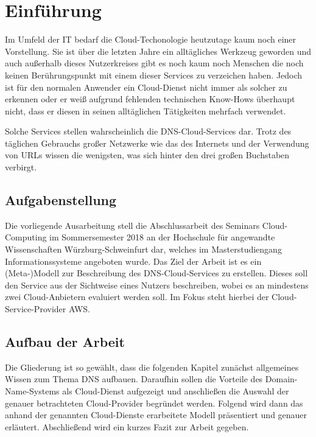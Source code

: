 \section{Einführung}
Im Umfeld der IT bedarf die Cloud-Techonologie heutzutage kaum noch einer Vorstellung. Sie ist über die letzten Jahre ein alltägliches Werkzeug geworden und auch außerhalb dieses Nutzerkreises gibt es noch kaum noch Menschen die noch keinen Berührungspunkt mit einem dieser Services zu verzeichen haben. Jedoch ist für den normalen Anwender ein Cloud-Dienst nicht immer als solcher zu erkennen oder er weiß aufgrund fehlenden technischen Know-Hows überhaupt nicht, dass er diesen in seinen alltäglichen Tätigkeiten mehrfach verwendet.

Solche Services stellen wahrscheinlich die DNS-Cloud-Services dar. Trotz des täglichen Gebrauchs großer Netzwerke wie das des Internets und der Verwendung von URLs wissen die wenigsten, was sich hinter den drei großen Buchstaben verbirgt.

\subsection{Aufgabenstellung}
Die vorliegende Ausarbeitung stell die Abschlussarbeit des Seminars Cloud-Computing im Sommersemester 2018 an der Hochschule für angewandte Wissenschaften Würzburg-Schweinfurt dar, welches im Masterstudiengang Informationssysteme angeboten wurde. Das Ziel der Arbeit ist es  ein (Meta-)Modell zur Beschreibung des DNS-Cloud-Services zu erstellen. Dieses soll den Service aus der Sichtweise eines Nutzers beschreiben, wobei es an mindestens zwei Cloud-Anbietern evaluiert werden soll. Im Fokus steht hierbei der Cloud-Service-Provider AWS.

\subsection{Aufbau der Arbeit}
Die Gliederung ist so gewählt, dass die folgenden Kapitel zunächst allgemeines Wissen zum Thema DNS aufbauen. Daraufhin sollen die Vorteile des Domain-Name-Systems als Cloud-Dienst aufgezeigt und anschließen die Auswahl der genauer betrachteten Cloud-Provider begründet werden. Folgend wird dann das anhand der genannten Cloud-Dienste erarbeitete Modell präsentiert und genauer erläutert. Abschließend wird ein kurzes Fazit zur Arbeit gegeben.
